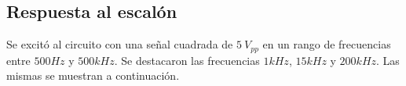 \subsection{Respuesta al escalón}

Se excitó al circuito con una señal cuadrada de $5~V_{pp}$ en un rango de frecuencias entre $500Hz$ y $500kHz$. Se destacaron las frecuencias $1kHz$, $15kHz$ y $200kHz$. Las mismas se muestran a continuación.

\begin{figure}[H]
\centering
{}%
\qquad
{}%

\end{figure}
